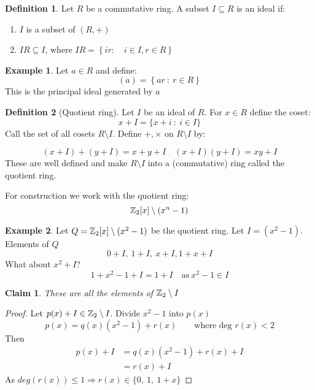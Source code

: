 \documentclass[]{article}
\newtheorem*{clm}{Claim}
\theoremstyle{definition}
\newtheorem*{defn}{Definition}
\newtheorem*{exmp}{Example}
\theoremstyle{remark}
\numberwithin{equation}{section}
\begin{document}
			\begin{defn}
				Let  $R$ be a commutative ring. A subset $I \subseteq R$ is an ideal if:
				\begin{enumerate}
					\item $I$ is a subset of $(R, +)$
					\item $IR \subseteq I$, where $IR = \left\{ir: \quad i\in I, r\in R\right\}$
				\end{enumerate}
			\end{defn}

			\begin{exmp}
				Let $a \in R$ and define:
				\[
					(a) = \left\{ar\ : \ r\in R\right\}
				\]
				This is the principal ideal generated by $a$
			\end{exmp}

			\begin{defn}[Quotient ring]
				Let $I$ be an ideal of $R$. For $x \in R$ define the coset:
				\[
					x + I = \{x +i \ :\ i \in I\}
				\]
				Call the set of all cosets $R\setminus I$. Define $+, \times$ on $R\setminus I$ by:

				\[
					(x+I)+(y+I) = x+y +I \quad (x+I)(y+I) = xy + I
				\]
				These are well defined and make $R\setminus I$ into a (commutative) ring called the quotient ring.
			\end{defn}

			For construction we work with the quotient ring:
			\[
				\mathbb{Z}_2[x] \setminus (x^n - 1)
			\]

			\begin{exmp}
				Let $Q = \mathbb{Z}_2[x] \setminus (x^2 - 1)$ be the quotient ring. Let $I = (x^2 -1)$. Elements of $Q$
				\[
					0 + I,\ 1+ I,\ x+I, 1+x + I
				\]
				What about $x^2 + I$?
				\[
					1+x^2 - 1 +I = 1+I \quad \text{as}\ x^2-1\in I
				\]
			\end{exmp}
			\begin{clm}
				These are all the elements of $\mathbb{Z}_2 \setminus I$
			\end{clm}

			\begin{proof}
				Let $p(x) + I \in \mathbb{Z}_2 \setminus I$. Divide $x^2-1$ into $p(x)$
				\[
					p(x) = q(x)(x^2-1) + r(x) \qquad \text{where deg $r(x) < 2$}
				\]
				Then
				\begin{align*}
					p(x) + I &= q(x)(x^2-1) + r(x) +I\\
							 &= r(x) + I
				\end{align*}
				As $deg(r(x)) \leq 1 \Rightarrow r(x) \in \{0,\ 1,\ 1+x \}$
			\end{proof}
\end{document}

